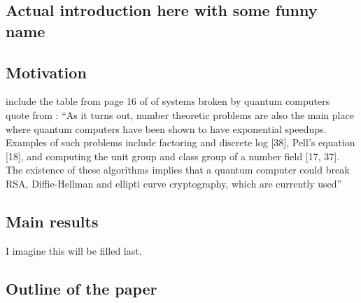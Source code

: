 \subsection{Actual introduction here with some funny name}
\subsection{Motivation}
include the table from page 16 of \cite{bernstein} of systems broken by quantum computers\\
quote from \cite{bernstein}: ``As it turns out, number theoretic problems are also the main place where quantum computers have been shown to have exponential speedups. Examples of such problems include factoring and discrete log [38], Pell’s equation [18], and computing the unit group and class group of a number field [17, 37]. The existence of these algorithms implies that a quantum computer could break RSA, Diffie-Hellman and ellipti curve cryptography, which are currently used''
\subsection{Main results}
I imagine this will be filled last.
\subsection{Outline of the paper}
